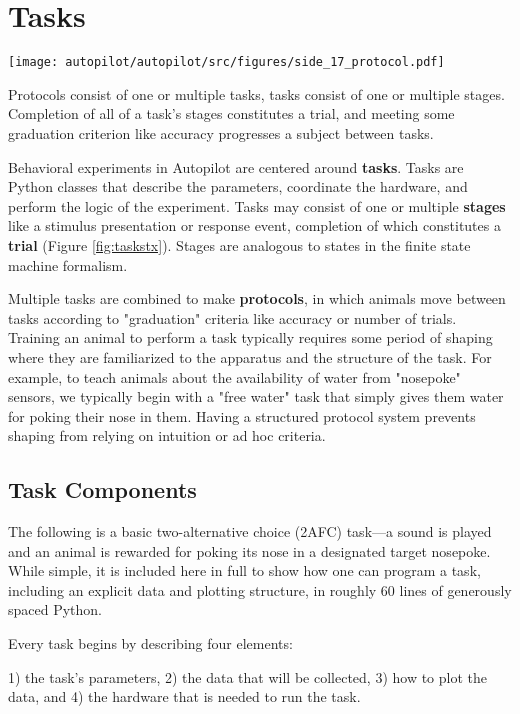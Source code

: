 \section{Tasks}
\label{sec:tasks}
\begin{marginfigure}[0cm]
\texttt{[image: autopilot/autopilot/src/figures/side\_17\_protocol.pdf]}
\caption{Protocols consist of one or multiple tasks, tasks consist of one or multiple stages. Completion of all of a task's stages constitutes a trial, and meeting some graduation criterion like accuracy progresses a subject between tasks.}
\label{fig:taskstx}
\end{marginfigure}

Behavioral experiments in Autopilot are centered around \textbf{tasks}. Tasks are Python classes that describe the parameters, coordinate the hardware, and perform the logic of the experiment. Tasks may consist of one or multiple \textbf{stages} like a stimulus presentation or response event, completion of which constitutes a \textbf{trial} (Figure \ref{fig:taskstx}). Stages are analogous to states in the finite state machine formalism. 

Multiple tasks are combined to make \textbf{protocols}, in which animals move between tasks according to "graduation" criteria like accuracy or number of trials. Training an animal to perform a task typically requires some period of shaping where they are familiarized to the apparatus and the structure of the task. For example, to teach animals about the availability of water from "nosepoke" sensors, we typically begin with a "free water" task that simply gives them water for poking their nose in them. Having a structured protocol system prevents shaping from relying on intuition or ad hoc criteria.


\subsection{Task Components}
\label{sec:taskcomponents}

The following is a basic two-alternative choice (2AFC) task---a sound is played and an animal is rewarded for poking its nose in a designated target nosepoke. While simple, it is included here in full to show how one can program a task, including an explicit data and plotting structure, in roughly 60 lines of generously spaced Python.

Every task begins by describing four elements: 

1) the task's parameters, 2) the data that will be collected, 3) how to plot the data, and 4) the hardware that is needed to run the task.

